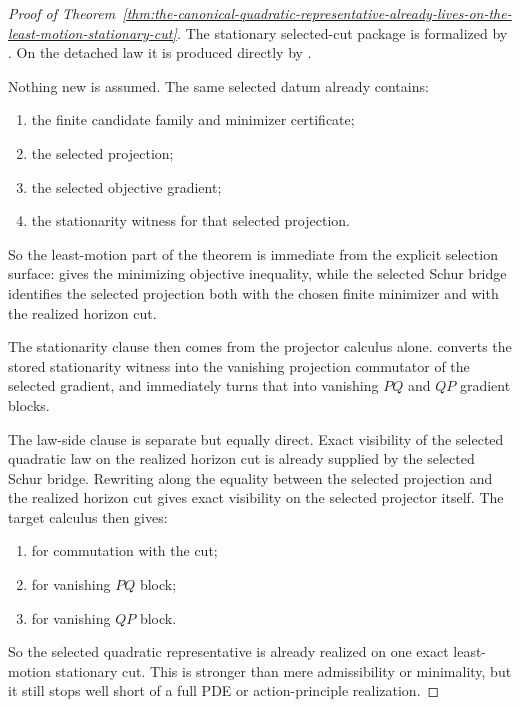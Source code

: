 \begin{proof}[Proof of Theorem~\ref{thm:the-canonical-quadratic-representative-already-lives-on-the-least-motion-stationary-cut}]
\label{proof:thm:the-canonical-quadratic-representative-already-lives-on-the-least-motion-stationary-cut}
The stationary selected-cut package is formalized by
. On the
detached law it is produced directly by
.

Nothing new is assumed. The same selected datum already contains:
\begin{enumerate}
\item the finite candidate family and minimizer certificate;
\item the selected projection;
\item the selected objective gradient;
\item the stationarity witness for that selected projection.
\end{enumerate}
So the least-motion part of the theorem is immediate from the explicit
selection surface:  gives the minimizing
objective inequality, while the selected Schur bridge identifies the selected
projection both with the chosen finite minimizer and with the realized horizon
cut.

The stationarity clause then comes from the projector calculus alone.
 converts the stored stationarity witness into the
vanishing projection commutator of the selected gradient, and
 immediately turns that into vanishing
\(PQ\) and \(QP\) gradient blocks.

The law-side clause is separate but equally direct. Exact visibility of the
selected quadratic law on the realized horizon cut is already supplied by the
selected Schur bridge. Rewriting along the equality between the selected
projection and the realized horizon cut gives exact visibility on the selected
projector itself. The target calculus then gives:
\begin{enumerate}
\item {} for commutation with the cut;
\item {} for vanishing \(PQ\) block;
\item {} for vanishing \(QP\) block.
\end{enumerate}
So the selected quadratic representative is already realized on one exact
least-motion stationary cut. This is stronger than mere admissibility or
minimality, but it still stops well short of a full PDE or action-principle
realization.
\end{proof}

